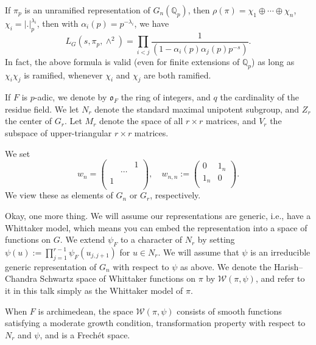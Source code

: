 \documentclass[reqno]{amsart} 
\begin{document}
\begin{example}
  If $\pi_p$ is an unramified representation of $G_n(\mathbb{Q}_p)$, then $\rho(\pi) = \chi_1 \oplus \dotsb \oplus \chi_n$, $\chi_i = \lvert . \rvert_p^{\lambda_i}$, then with $\alpha_i(p) = p^{- \lambda_i}$, we have
  \begin{equation*}
    L_G(s, \pi_p, \wedge^2) = \prod_{i < j} \frac{1}{ \left( 1 - \alpha_i(p) \alpha_j(p) p^{- s} \right)}.
  \end{equation*}
  In fact, the above formula is valid (even for finite extensions of $\mathbb{Q}_p$) as long as $\chi_i \chi_j$ is ramified, whenever $\chi_i$ and $\chi_j$ are both ramified.
\end{example}

If $F$ is $p$-adic, we denote by $\mathfrak{o}_F$ the ring of integers, and $q$ the cardinality of the residue field.  We let $N_r$ denote the standard maximal unipotent subgroup, and $Z_r$ the center of $G_r$.  Let $M_r$ denote the space of all $r \times r$ matrices, and $V_r$ the subspace of upper-triangular $r \times r$ matrices.

We set
\begin{equation*}
  w_n =
  \begin{pmatrix}
    &  & 1 \\
    & \dotsb &  \\
    1 &  &  \\
  \end{pmatrix},
  \quad
  w_{n, n} :=
  \begin{pmatrix}
    0    & 1_n \\
    1_n         & 0 \\
  \end{pmatrix}.
\end{equation*}
We view these as elements of $G_n$ or $G_r$, respectively.

Okay, one more thing.  We will assume our representations are generic, i.e., have a Whittaker model, which means you can embed the representation into a space of functions on $G$.  We extend $\psi_F$ to a character of $N_r$ by setting $\psi(u) := \prod_{j = 1}^{r - 1} \psi_F(u_{j, j + 1})$ for $u \in N_r$.  We will assume that $\psi$ is an irreducible generic representation of $G_n$ with respect to $\psi$ as above.  We denote the Harish--Chandra Schwartz space of Whittaker functions on $\pi$ by $\mathcal{W}(\pi, \psi)$, and refer to it in this talk simply as the Whittaker model of $\pi$.

When $F$ is archimedean, the space $\mathcal{W}(\pi, \psi)$ consists of smooth functions satisfying a moderate growth condition, transformation property with respect to $N_r$ and $\psi$, and is a Frech{\'e}t space.
\end{document}
